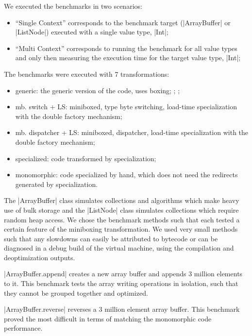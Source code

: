 We executed the benchmarks in two scenarios:
\begin{itemize}
\item ``Single Context'' corresponds to the benchmark target (|ArrayBuffer| or |ListNode|) executed with a single value type, |Int|;
\item ``Multi Context'' corresponds to running the benchmark for all value types and only then measuring the execution time for the target value type, |Int|;
\end{itemize}  
\vspace{0mm}
The benchmarks were executed with 7 transformations:
\begin{itemize}
\item {generic}: the generic version of the code, uses boxing;
;
;
\item {mb. switch + LS}: miniboxed, type byte switching, load-time specialization with the double factory mechanism; 
\item {mb. dispatcher + LS}: miniboxed, dispatcher, load-time specialization with the double factory mechanism;
\item {specialized}: code transformed by specialization;
\item {monomorphic}: code specialized by hand, which does not need the redirects generated by specialization.
\end{itemize}
\vspace{-1mm}

 The |ArrayBuffer| class simulates collections and algorithms which make heavy use of bulk storage and the |ListNode| class simulates collections which require random heap access. We chose the benchmark methods such that each tested a certain feature of the miniboxing transformation. We used very small methods such that any slowdowns can easily be attributed to bytecode or can be diagnosed in a debug build of the virtual machine, using the compilation and deoptimization outputs. 

|ArrayBuffer.append| creates a new array buffer and appends 3 million elements to it. This benchmark tests the array writing operations in isolation, such that they cannot be grouped together and optimized. 

|ArrayBuffer.reverse| reverses a 3 million element array buffer. This benchmark proved the most difficult in terms of matching the monomorphic code performance.

